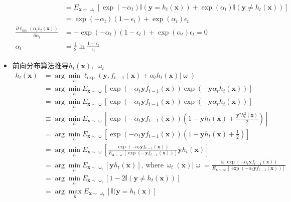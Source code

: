 \documentclass[a4paper]{article}
\begin{document}
\begin{itemize}
\begin{align*}
							& = E_{\textbf{x}\sim\upomega_t}[\exp(-\alpha_t)\mathbb{I}(\textbf{y}=h_t(\textbf{x}))+
						 		\exp(\alpha_t)\mathbb{I}(\textbf{y} \neq h_t(\textbf{x}))] \\
							& = \exp(-\alpha_t)(1-\epsilon_t) + \exp(\alpha_t)\epsilon_t\\
						\frac{\partial \ell_{\exp}(\alpha_th_t(\textbf{x}))}{\partial \alpha_t}
							& = -\exp(-\alpha_t)(1-\epsilon_t) + \exp(\alpha_t)\epsilon_t = 0 \\
						\alpha_t 
							& = \frac{1}{2}\ln\frac{1-\epsilon_t}{\epsilon_t}
					\end{align*}
				\item 前向分布算法推导$h_t(\textbf{x}),\,\upomega_t$
					\begin{align*}
						h_t(\textbf{x}) 
							& = \arg\min_h \ell_{\exp}\left(\textbf{y},f_{t-1}(\textbf{x})+\alpha_th_t(\textbf{x})|\upomega\right) \\
							& = \arg\min_h E_{\textbf{x}\sim\upomega}\left[\exp(-\alpha_t\textbf{y}f_{t-1}(\textbf{x}))\exp(-\textbf{y}\alpha_th_t(\textbf{x}))\right]\\
							& = \arg\min_h E_{\textbf{x}\sim\upomega}\left[\exp(-\alpha_t\textbf{y}f_{t-1}(\textbf{x}))\exp(-\textbf{y}\alpha_th_t(\textbf{x}))\right]\\
				   			& \equiv \arg\min_h E_{\textbf{x}\sim\upomega}\left[\exp\left(-\alpha_t\textbf{y}f_{t-1}(\textbf{x})\right)
				   									\left(1-\textbf{y}h_t(\textbf{x}) + \frac{\textbf{y}^2h_t^2(\textbf{x})}{2}\right)\right]\\
				   			& = \arg\min_h E_{\textbf{x}\sim\upomega}\left[\exp(-\alpha_t\textbf{y}f_{t-1}(\textbf{x}))\left(1-\textbf{y}h_t(\textbf{x})+\frac{1}{2}\right)\right] \\
				   			& = \arg\min_h E_{\textbf{x}\sim\upomega}\left[\frac{\exp(-\alpha_t\textbf{y}f_{t-1}(\textbf{x}))}
				   									{E_{\textbf{x}\sim\upomega}[\exp(-\textbf{y}f_{t-1}(\textbf{x}))]}\textbf{y}h_t(\textbf{x})\right] \\
				   			& = \arg\min_h E_{\textbf{x}\sim\upomega_t}[\textbf{y}h_t(\textbf{x})], \, \text{where}\, \upomega_t(\textbf{x})|\upomega = 
				   				\frac{\upomega\exp(-\alpha_t\textbf{y}f_{t-1}(\textbf{x}))}{E_{\textbf{x}\sim\upomega}[\exp(-\alpha_t\textbf{y}f_{t-1}(\textbf{x}))]} \\
						   	& = \arg\min_h E_{\textbf{x}\sim\upomega_t}[1-2\mathbb{I}(\textbf{y}\neq h_t(\textbf{x}))]\\ 
						   	& = \arg\max_h E_{\textbf{x}\sim\upomega_t}[\mathbb{I}(\textbf{y}= h_t(\textbf{x})]\\

\end{align*}
\end{itemize}
\end{document}
